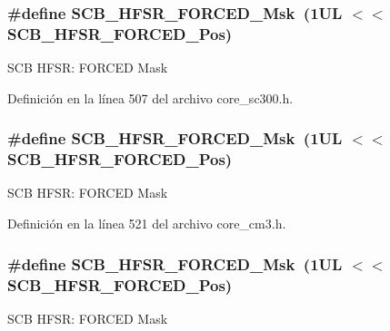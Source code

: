 \subsubsection[{\texorpdfstring{S\+C\+B\+\_\+\+H\+F\+S\+R\+\_\+\+F\+O\+R\+C\+E\+D\+\_\+\+Msk}{SCB_HFSR_FORCED_Msk}}]{\setlength{\rightskip}{0pt plus 5cm}\#define S\+C\+B\+\_\+\+H\+F\+S\+R\+\_\+\+F\+O\+R\+C\+E\+D\+\_\+\+Msk~(1\+U\+L $<$$<$ S\+C\+B\+\_\+\+H\+F\+S\+R\+\_\+\+F\+O\+R\+C\+E\+D\+\_\+\+Pos)}\hypertarget{group___c_m_s_i_s___s_c_b_ga6560d97ed043bc01152a7247bafa3157}{}\label{group___c_m_s_i_s___s_c_b_ga6560d97ed043bc01152a7247bafa3157}
S\+CB H\+F\+SR\+: F\+O\+R\+C\+ED Mask 

Definición en la línea 507 del archivo core\+\_\+sc300.\+h.

\subsubsection[{\texorpdfstring{S\+C\+B\+\_\+\+H\+F\+S\+R\+\_\+\+F\+O\+R\+C\+E\+D\+\_\+\+Msk}{SCB_HFSR_FORCED_Msk}}]{\setlength{\rightskip}{0pt plus 5cm}\#define S\+C\+B\+\_\+\+H\+F\+S\+R\+\_\+\+F\+O\+R\+C\+E\+D\+\_\+\+Msk~(1\+U\+L $<$$<$ S\+C\+B\+\_\+\+H\+F\+S\+R\+\_\+\+F\+O\+R\+C\+E\+D\+\_\+\+Pos)}\hypertarget{group___c_m_s_i_s___s_c_b_ga6560d97ed043bc01152a7247bafa3157}{}\label{group___c_m_s_i_s___s_c_b_ga6560d97ed043bc01152a7247bafa3157}
S\+CB H\+F\+SR\+: F\+O\+R\+C\+ED Mask 

Definición en la línea 521 del archivo core\+\_\+cm3.\+h.

\subsubsection[{\texorpdfstring{S\+C\+B\+\_\+\+H\+F\+S\+R\+\_\+\+F\+O\+R\+C\+E\+D\+\_\+\+Msk}{SCB_HFSR_FORCED_Msk}}]{\setlength{\rightskip}{0pt plus 5cm}\#define S\+C\+B\+\_\+\+H\+F\+S\+R\+\_\+\+F\+O\+R\+C\+E\+D\+\_\+\+Msk~(1\+U\+L $<$$<$ S\+C\+B\+\_\+\+H\+F\+S\+R\+\_\+\+F\+O\+R\+C\+E\+D\+\_\+\+Pos)}\hypertarget{group___c_m_s_i_s___s_c_b_ga6560d97ed043bc01152a7247bafa3157}{}\label{group___c_m_s_i_s___s_c_b_ga6560d97ed043bc01152a7247bafa3157}
S\+CB H\+F\+SR\+: F\+O\+R\+C\+ED Mask 

